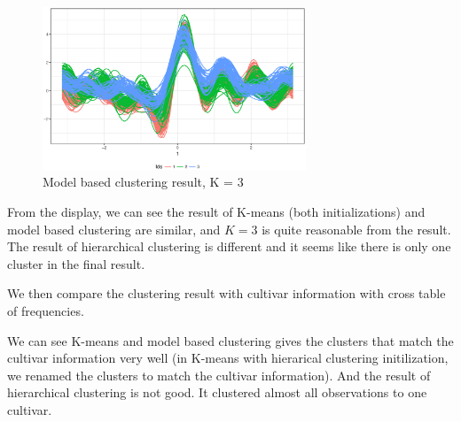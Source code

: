 \documentclass{article}
\begin{document}
\begin{enumerate}[leftmargin = 0 em, label = \arabic*., font = \bfseries]
		\begin{figure}[!htb]
		\centering
		\includegraphics[width = 0.7\textwidth]{mcl.eps}
		\caption{Model based clustering result, K = 3}
		\label{mcl}
	\end{figure}

From the display, we can see the result of K-means (both initializations) and model based clustering are similar, and $K = 3$ is quite reasonable from the result. The result of hierarchical clustering is different and it seems like there is only one cluster in the final result. 

We then compare the clustering result with cultivar information with cross table of frequencies. 

We can see K-means and model based clustering gives the clusters that match the cultivar information very well (in K-means with hierarical clustering initilization, we renamed the clusters to match the cultivar information). And the result of hierarchical clustering is not good. It clustered almost all observations to one cultivar.  


\end{enumerate}
\end{document}
